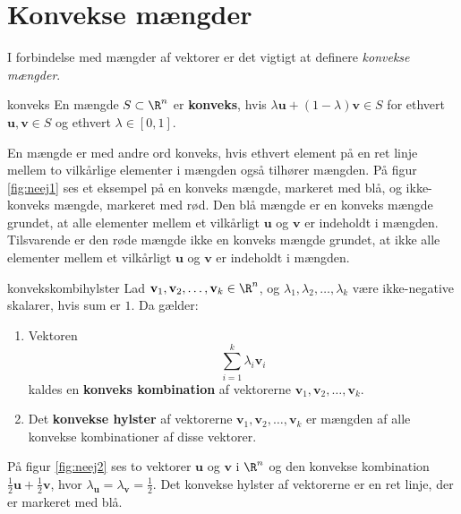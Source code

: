 \section{Konvekse mængder}
\label{julieerlakker}
%

%
I forbindelse med mængder af vektorer er det vigtigt at definere \textit{konvekse mængder}.
%
\begin{defn}{}{konveks}
En mængde $S \subset \R^n$ er \textbf{konveks}, hvis $\lambda \textbf{u} + (1- \lambda ) \textbf{v} \in S$ for ethvert $\textbf{u}, \textbf{v} \in S$ og ethvert $\lambda \in [0,1]$. 
\end{defn}
\noindent
%
En mængde er med andre ord konveks, hvis ethvert element på en ret linje mellem to vilkårlige elementer i mængden også tilhører mængden. 
På figur \ref{fig:neej1} ses et eksempel på en konveks mængde, markeret med blå, og ikke-konveks mængde, markeret med rød.
Den blå mængde er en konveks mængde grundet, at alle elementer mellem et vilkårligt $\textbf{u}$ og $\textbf{v}$ er indeholdt i mængden.
Tilsvarende er den røde mængde ikke en konveks mængde grundet, at ikke alle elementer mellem et vilkårligt $\textbf{u}$ og $\textbf{v}$ er indeholdt i mængden.\\
%

%
\begin{defn}{}{konvekskombihylster}
Lad $\textbf{v}_1, \textbf{v}_2, \ldots, \textbf{v}_k \in \R^n$, og $\lambda_1, \lambda_2, \ldots, \lambda_k$ være ikke-negative skalarer, hvis sum er $1$. Da gælder:
%
\begin{enumerate}[label=(\alph*)]
	\item Vektoren $$\sum_{i=1}^{k} \lambda_i \textbf{v}_i$$ kaldes en \textbf{konveks kombination} af vektorerne $\textbf{v}_1, \textbf{v}_2, \ldots, \textbf{v}_k$. 
	\item Det \textbf{konvekse hylster} af vektorerne $\textbf{v}_1, \textbf{v}_2, \ldots, \textbf{v}_k$ er mængden af alle konvekse kombinationer af disse vektorer. 
\end{enumerate}
%
%
\end{defn}
%
På figur \ref{fig:neej2} ses to vektorer $\mathbf{u}$ og $\mathbf{v}$ i $\R^n$ og den konvekse kombination $\frac{1}{2} \mathbf{u}+\frac{1}{2} \mathbf{v}$, hvor $\lambda_\textbf{u} = \lambda_\textbf{v} = \frac{1}{2}$. 
Det konvekse hylster af vektorerne er en ret linje, der er markeret med blå. 
\\\\
%

